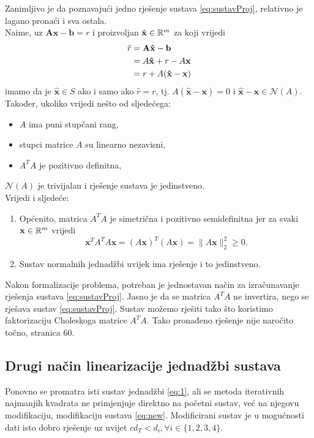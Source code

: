 \documentclass[a4paper,twoside,12pt]{memoir} %
\begin{document}
Zanimljivo je da poznavajući
 jedno rješenje sustava \ref{eq:sustavProj}, relativno je lagano pronaći i sva ostala.\\
Naime, uz $\mathbf{A}\mathbf{x} - \mathbf{b} = r$ i proizvoljan $\hat{\mathbf{x}} \in \mathbb{R}^m$ za koji vrijedi
\begin{align}
\hat{r}  &=  \mathbf{A}\mathbf{\hat{x}} - \mathbf{b} \notag \\
&= A\mathbf{\hat{x}} + r - A\mathbf{x}\notag \\
&= r + A(\mathbf{\hat{x}} - \mathbf{x}) \notag
\end{align}
imamo da je $\mathbf{\hat{x}} \in S$ ako i samo ako $\hat{r} = r$, tj.  $ A(\mathbf{\hat{x}} - \mathbf{x}) = 0$ i $\mathbf{\hat{x}} - \mathbf{x} \in \mathcal{N}(A)$.\\
Također, ukoliko vrijedi nešto od sljedećega:%
\begin{itemize}
	\item $A$ ima puni stupčani rang,
	\item stupci matrice $A$ su linearno nezavisni,
	\item $A^TA$ je pozitivno definitna,
\end{itemize}
$\mathcal{N}(A)$ je trivijalan i rješenje sustava je jedinstveno. 
\vspace{0.2cm}
\\Vrijedi i sljedeće:%
\begin{enumerate}
	\item Općenito, matrica $A^TA$ je simetrična i pozitivno semidefinitna jer za svaki
	$\mathbf{x} \in \mathbb{R}^m$ vrijedi
	$$  \mathbf{x}^TA^TA\mathbf{x} = (A\mathbf{x})^T(A\mathbf{x}) = \|A\mathbf{x}\|_2^2 \geq 0. $$
	\item Sustav normalnih jednadžbi uvijek ima rješenje i to jedinstveno.
\end{enumerate}
\vspace{1cm}
Nakon formalizacije problema, potreban je jednostavan način za izračunavanje rješenja sustava \ref{eq:sustavProj}.
Jasno je da se matrica $A^TA$ ne invertira, nego se rješava sustav \ref{eq:sustavProj}.
Sustav možemo rješiti tako što koristimo faktorizaciju Choleskoga matrice $A^TA$.
Tako pronađeno rješenje nije naročito točno\cite{singer07}, stranica 60.

\subsection{Drugi način linearizacije jednadžbi sustava}
Ponovno se promatra isti sustav jednadžbi \ref{eq:1}, ali se 
metoda iterativnih najmanjih kvadrata ne primjenjuje direktno na početni sustav, već na njegovu modifikaciju, modifikaciju sustava \ref{eq:new}.
Modificirani sustav je u mogućnosti dati isto dobro rješenje uz uvijet $cd_T < d_i, \forall i \in \{1,2,3,4\}$. \\
\end{document}
